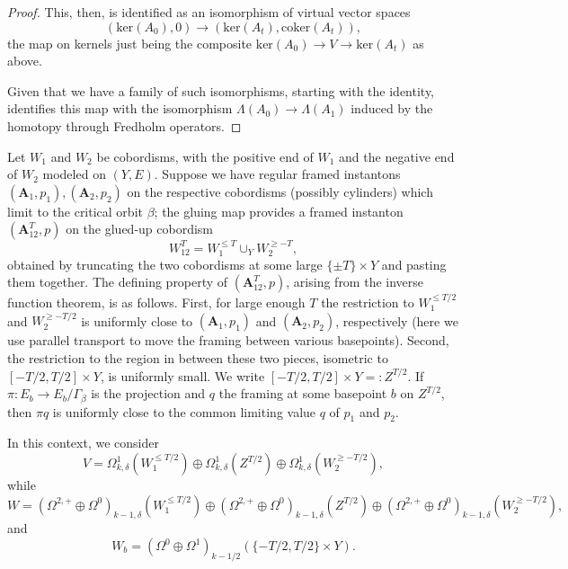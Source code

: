 \documentclass{memo-l}
\theoremstyle{definition}
\theoremstyle{remark}
\numberwithin{section}{chapter}
\numberwithin{equation}{chapter}
\begin{document}
\begin{proof}
This, then, is identified as an isomorphism of virtual vector spaces 
$$(\text{ker}(A_0), 0) \to (\text{ker}(A_t), \text{coker}(A_t)),$$
the map on kernels just being the composite $\text{ker}(A_0) \to V \to \text{ker}(A_t)$ as above.

Given that we have a family of such isomorphisms, starting with the identity, identifies this map with the isomorphism $\Lambda(A_0) \to \Lambda(A_1)$ induced by the homotopy through Fredholm operators.
\end{proof}

Let $W_1$ and $W_2$ be cobordisms, with the positive end of $W_1$ and the negative end of $W_2$ modeled on $(Y, E)$. Suppose we have regular framed instantons $(\mathbf{A}_1,p_1), (\mathbf{A}_2,p_2)$ on the respective cobordisms (possibly cylinders) which limit to the critical orbit $\beta$; the gluing map provides a framed instanton $(\mathbf{A}_{12}^T,p)$ on the glued-up cobordism 
$$W_{12}^T = W_1^{\leq T} \cup_Y W_2^{\geq -T},$$ 
obtained by truncating the two cobordisms at some large $\{\pm T\} \times Y$ and pasting them together. The defining property of $(\mathbf{A}_{12}^T,p)$, arising from the inverse function theorem, is as follows. First, for large enough $T$ the restriction to $W_1^{\leq T/2}$ and $W_2^{\geq -T/2}$ is uniformly close to $(\mathbf{A}_1, p_1)$ and $(\mathbf{A}_2, p_2)$, respectively (here we use parallel transport to move the framing between various basepoints). Second, the restriction to the region in between these two pieces, isometric to $[-T/2, T/2] \times Y$, is uniformly small. We write $[-T/2, T/2] \times Y =: Z^{T/2}$. If $\pi: E_b \to E_b/\Gamma_{\beta}$ is the projection and $q$ the framing at some basepoint $b$ on $Z^{T/2}$, then $\pi q$ is uniformly close to the common limiting value $q$ of $p_1$ and $p_2$.

In this context, we consider 
$$V = \Omega^1_{k,\delta}(W_1^{\leq T/2}) \oplus \Omega^1_{k,\delta}(Z^{T/2}) \oplus \Omega^1_{k,\delta}(W_2^{\geq -T/2}),$$ 
while 
$$W = (\Omega^{2,+} \oplus \Omega^0)_{k-1,\delta}(W_1^{\leq T/2}) \oplus (\Omega^{2,+} \oplus \Omega^0)_{k-1,\delta}(Z^{T/2}) \oplus (\Omega^{2,+} \oplus \Omega^0)_{k-1,\delta}(W_2^{\geq -T/2}),$$ 
and 
$$W_b = (\Omega^0 \oplus \Omega^1)_{k-1/2}(\{-T/2, T/2\} \times Y).$$ 
\end{document}
